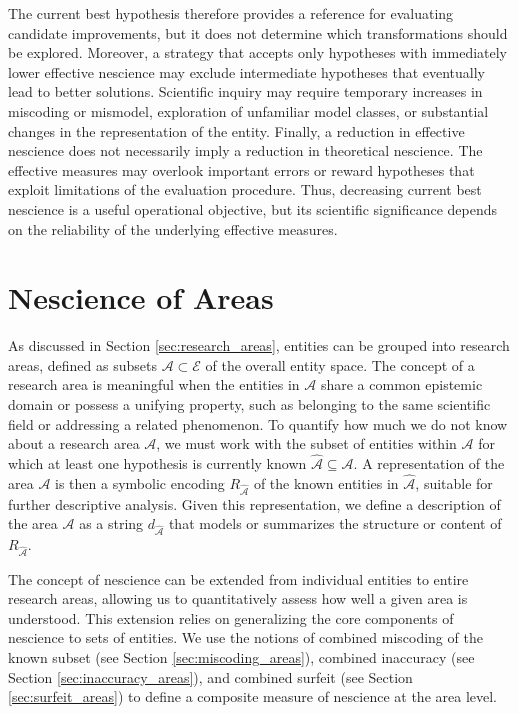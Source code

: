 The current best hypothesis therefore provides a reference for evaluating candidate improvements, but it does not determine which transformations should be explored. Moreover, a strategy that accepts only hypotheses with immediately lower effective nescience may exclude intermediate hypotheses that eventually lead to better solutions. Scientific inquiry may require temporary increases in miscoding or mismodel, exploration of unfamiliar model classes, or substantial changes in the representation of the entity. Finally, a reduction in effective nescience does not necessarily imply a reduction in theoretical nescience. The effective measures may overlook important errors or reward hypotheses that exploit limitations of the evaluation procedure. Thus, decreasing current best nescience is a useful operational objective, but its scientific significance depends on the reliability of the underlying effective measures.

%
%

\section{Nescience of Areas}
\label{sec:nescience_areas}

As discussed in Section \ref{sec:research_areas}, entities can be grouped into research areas, defined as subsets $\mathcal{A} \subset \mathcal{E}$ of the overall entity space. The concept of a research area is meaningful when the entities in $\mathcal{A}$ share a common epistemic domain or possess a unifying property, such as belonging to the same scientific field or addressing a related phenomenon. To quantify how much we do not know about a research area $\mathcal{A}$, we must work with the subset of entities within $\mathcal{A}$ for which at least one hypothesis is currently known $\hat{\mathcal{A}} \subseteq \mathcal{A}$. A representation of the area $\mathcal{A}$ is then a symbolic encoding $R_{\hat{\mathcal{A}}}$ of the known entities in $\hat{\mathcal{A}}$, suitable for further descriptive analysis. Given this representation, we define a description of the area $\mathcal{A}$ as a string $d_{\hat{\mathcal{A}}}$ that models or summarizes the structure or content of $R_{\hat{\mathcal{A}}}$.

The concept of nescience can be extended from individual entities to entire research areas, allowing us to quantitatively assess how well a given area is understood. This extension relies on generalizing the core components of nescience to sets of entities. We use the notions of combined miscoding of the known subset (see Section \ref{sec:miscoding_areas}), combined inaccuracy (see Section \ref{sec:inaccuracy_areas}), and combined surfeit (see Section \ref{sec:surfeit_areas}) to define a composite measure of nescience at the area level.

